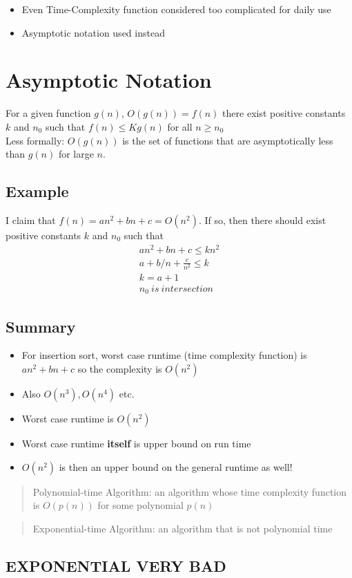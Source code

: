 \documentclass[12pt, letter]{article}
\begin{document}
\begin{itemize}
	\item Even Time-Complexity function considered too complicated for daily use
	\item Asymptotic notation used instead
\end{itemize}

\section{Asymptotic Notation}%
\label{sec:asymptotic_notation}
For a given function $g(n)$, $O(g(n))=f(n)$ there exist positive constants $k$ and  $n_0$ such that  $f(n) \le Kg(n)$ for all  $n \ge n_0$ \\
Less formally: $O(g(n))$ is the set of functions that are asymptotically less than $g(n)$ for large  $n$.

\subsection*{Example}
I claim that $f(n) = an^2+bn+c = O(n^2) $. If so, then there should exist positive constants $k$ and  $n_0$ such that
\begin{gather*}
an^2+bn+c \le kn^2 \\
a+b/n +\frac{c}{n^2} \le k \\
k = a+1 \\
n_0\ is\ intersection
\end{gather*}

\subsection*{Summary}
\begin{itemize}
	\item For insertion sort, worst case runtime (time complexity function) is $an^2+bn+c$ so the complexity is $O(n^2)$ \\
	\item Also $O(n^{3}), O(n^{4})$ etc.
	\item Worst case runtime is $O(n^2)$
	\item Worst case runtime \textbf{itself} is upper bound on run time
	\item $O(n^2)$ is then an upper bound on the general runtime as well!
\end{itemize}

\begin{quote}
	Polynomial-time Algorithm: an algorithm whose time complexity function is $O(p(n))$ for some polynomial $p(n)$
\end{quote}

\begin{quote}
	Exponential-time Algorithm: an algorithm that is not polynomial time
\end{quote}

\subsection*{EXPONENTIAL VERY BAD}
\end{document}
